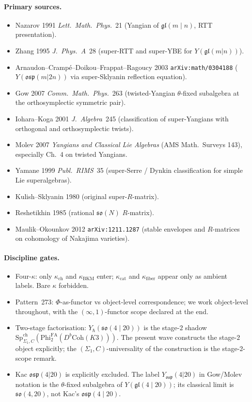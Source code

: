 \documentclass{article}
\providecommand{\fgl}{\mathfrak{gl}}
\providecommand{\fso}{\mathfrak{so}}
\providecommand{\fosp}{\mathfrak{osp}}
\providecommand{\kch}{\kappa_{\mathrm{ch}}}
\providecommand{\kcat}{\kappa_{\mathrm{cat}}}
\providecommand{\kBKM}{\kappa_{\mathrm{BKM}}}
\providecommand{\kfib}{\kappa_{\mathrm{fiber}}}
\providecommand{\PhiFA}{\mathrm{Phi}^{\mathrm{FA}}}
\providecommand{\SpCh}{\mathrm{Sp}^{\mathrm{ch}}}
\theoremstyle{definition}
\begin{document}
\paragraph{Primary sources.}
\begin{itemize}
\item Nazarov 1991 \emph{Lett.\ Math.\ Phys.}~21 (Yangian of
  $\fgl(m \mid n)$, RTT presentation).
\item Zhang 1995 \emph{J.\ Phys.\ A}~28 (super-RTT and super-YBE for
  $Y(\fgl(m|n))$).
\item Arnaudon--Cramp\'e--Doikou--Frappat--Ragoucy 2003
  \texttt{arXiv:math/0304188} ($Y(\fosp(m|2n))$ via super-Sklyanin
  reflection equation).
\item Gow 2007 \emph{Comm.\ Math.\ Phys.}~263 (twisted-Yangian
  $\theta$-fixed subalgebra at the orthosymplectic symmetric pair).
\item Iohara--Koga 2001 \emph{J.\ Algebra}~245 (classification of
  super-Yangians with orthogonal and orthosymplectic twists).
\item Molev 2007 \emph{Yangians and Classical Lie Algebras} (AMS
  Math.\ Surveys 143), especially Ch.~4 on twisted Yangians.
\item Yamane 1999 \emph{Publ.\ RIMS}~35 (super-Serre / Dynkin classification
  for simple Lie superalgebras).
\item Kulish--Sklyanin 1980 (original super-$R$-matrix).
\item Reshetikhin 1985 (rational $\fso(N)$ $R$-matrix).
\item Maulik--Okounkov 2012 \texttt{arXiv:1211.1287} (stable envelopes
  and $R$-matrices on cohomology of Nakajima varieties).
\end{itemize}

\paragraph{Discipline gates.}
\begin{itemize}
\item Four-$\kappa$: only $\kch$ and $\kBKM$ enter; $\kcat$ and
  $\kfib$ appear only as ambient labels. Bare $\kappa$ forbidden.
\item Pattern~273: $\Phi$-as-functor vs object-level correspondence;
  we work object-level throughout, with the $(\infty,1)$-functor
  scope declared at the end.
\item Two-stage factorisation: $Y_\hbar(\fso(4 \mid 20))$ is the
  stage-$2$ shadow $\SpCh_{\Sigma_1, C}(\PhiFA_2(D^b\mathrm{Coh}(K3)))$.
  The present wave constructs the stage-$2$ object explicitly; the
  $(\Sigma_1, C)$-universality of the construction is the
  stage-$2$-scope remark.
\item Kac $\fosp(4|20)$ is explicitly excluded. The label
  $Y_{\fosp}(4|20)$ in Gow/Molev notation is the $\theta$-fixed
  subalgebra of $Y(\fgl(4 \mid 20))$; its classical limit is
  $\fso(4, 20)$, not Kac's $\fosp(4 \mid 20)$.
\end{itemize}
\end{document}
